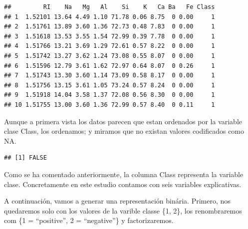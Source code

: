 \documentclass[]{article}
\newenvironment{Shaded}{\begin{snugshade}}{\end{snugshade}}
\newcommand{\ControlFlowTok}[1]{\textcolor[rgb]{0.13,0.29,0.53}{\textbf{#1}}}
\newcommand{\DecValTok}[1]{\textcolor[rgb]{0.00,0.00,0.81}{#1}}
\newcommand{\KeywordTok}[1]{\textcolor[rgb]{0.13,0.29,0.53}{\textbf{#1}}}
\newcommand{\NormalTok}[1]{#1}
\newcommand{\OperatorTok}[1]{\textcolor[rgb]{0.81,0.36,0.00}{\textbf{#1}}}
\newcommand{\StringTok}[1]{\textcolor[rgb]{0.31,0.60,0.02}{#1}}
\begin{document}
\begin{verbatim}
##         RI    Na   Mg   Al    Si    K   Ca Ba   Fe Class
## 1  1.52101 13.64 4.49 1.10 71.78 0.06 8.75  0 0.00     1
## 2  1.51761 13.89 3.60 1.36 72.73 0.48 7.83  0 0.00     1
## 3  1.51618 13.53 3.55 1.54 72.99 0.39 7.78  0 0.00     1
## 4  1.51766 13.21 3.69 1.29 72.61 0.57 8.22  0 0.00     1
## 5  1.51742 13.27 3.62 1.24 73.08 0.55 8.07  0 0.00     1
## 6  1.51596 12.79 3.61 1.62 72.97 0.64 8.07  0 0.26     1
## 7  1.51743 13.30 3.60 1.14 73.09 0.58 8.17  0 0.00     1
## 8  1.51756 13.15 3.61 1.05 73.24 0.57 8.24  0 0.00     1
## 9  1.51918 14.04 3.58 1.37 72.08 0.56 8.30  0 0.00     1
## 10 1.51755 13.00 3.60 1.36 72.99 0.57 8.40  0 0.11     1
\end{verbatim}

Aunque a primera vista los datos parecen que estan ordenados por la
variable clase Class, los ordenamos; y miramos que no existan valores
codificados como NA.

\begin{Shaded}
\end{Shaded}

\begin{verbatim}
## [1] FALSE
\end{verbatim}

Como se ha comentado anteriormente, la columna Class representa la
variable clase. Concretamente en este estudio contamos con seis
variables explicativas.

A continuación, vamos a generar una representación binária. Primero, nos
quedaremos solo con los valores de la varible classe \{1, 2\}, los
renombraremos com \{1 = ``positive'', 2 = ``negative''\} y
factorizaremos.

\begin{Shaded}
\end{Shaded}
\end{document}
